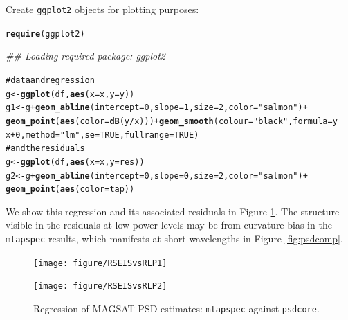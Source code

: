 \documentclass{article}\usepackage{graphicx, color}
\makeatletter
\newcommand{\hlfunctioncall}[1]{\textcolor[rgb]{0.501960784313725,0,0.329411764705882}{\textbf{#1}}}%
\newcommand{\hlstring}[1]{\textcolor[rgb]{0.6,0.6,1}{#1}}%
\newcommand{\hlcomment}[1]{\textcolor[rgb]{0.180392156862745,0.6,0.341176470588235}{#1}}%
\newenvironment{kframe}{%
 \def\at@end@of@kframe{}%
 \ifinner\ifhmode%
  \def\at@end@of@kframe{\end{minipage}}%
  \begin{minipage}{\columnwidth}%
 \fi\fi%
 \def\FrameCommand##1{\hskip\@totalleftmargin \hskip-\fboxsep
 \colorbox{shadecolor}{##1}\hskip-\fboxsep
     \hskip-\linewidth \hskip-\@totalleftmargin \hskip\columnwidth}%
 \MakeFramed {\advance\hsize-\width
   \@totalleftmargin\z@ \linewidth\hsize
   \@setminipage}}%
 {\par\unskip\endMakeFramed%
 \at@end@of@kframe}
\newenvironment{knitrout}{}{} %
\newcommand{\Rcmd}[1]{\texttt{#1}}
\makeatother
\begin{document}
Create \Rcmd{ggplot2} objects for plotting purposes:
\begin{knitrout}
\color{fgcolor}\begin{kframe}
\begin{alltt}
\hlfunctioncall{require}(ggplot2)
\end{alltt}


{\ttfamily\noindent\itshape\textcolor{messagecolor}{\#\# Loading required package: ggplot2}}\begin{alltt}
\hlcomment{# data and regression}
g <- \hlfunctioncall{ggplot}(df, \hlfunctioncall{aes}(x = x, y = y))
g1 <- g + \hlfunctioncall{geom_abline}(intercept = 0, slope = 1, size = 2, color = \hlstring{"salmon"}) + 
    \hlfunctioncall{geom_point}(\hlfunctioncall{aes}(color = \hlfunctioncall{dB}(y/x))) + \hlfunctioncall{geom_smooth}(colour = \hlstring{"black"}, formula = y ~ 
    x + 0, method = \hlstring{"lm"}, se = TRUE, fullrange = TRUE)
\hlcomment{# and the residuals}
g <- \hlfunctioncall{ggplot}(df, \hlfunctioncall{aes}(x = x, y = res))
g2 <- g + \hlfunctioncall{geom_abline}(intercept = 0, slope = 0, size = 2, color = \hlstring{"salmon"}) + 
    \hlfunctioncall{geom_point}(\hlfunctioncall{aes}(color = tap))
\end{alltt}
\end{kframe}
\end{knitrout}

We show this regression and its 
associated residuals in Figure \ref{fig:psdreg}.  
The structure visible in the residuals
at low power levels may be from curvature bias in
the \Rcmd{mtapspec} results, which
manifests at short wavelengths
in Figure \ref{fig:psdcomp}.

\begin{figure}[htb!]
\begin{center}
\begin{knitrout}
\color{fgcolor}
\texttt{[image: figure/RSEISvsRLP1]} 

\end{knitrout}

\begin{knitrout}
\color{fgcolor}
\texttt{[image: figure/RSEISvsRLP2]} 

\end{knitrout}

\caption{Regression of  MAGSAT PSD estimates: 
\Rcmd{mtapspec} against \Rcmd{psdcore}.}
\label{fig:psdreg}
\end{center}
\end{figure}
\end{document}
